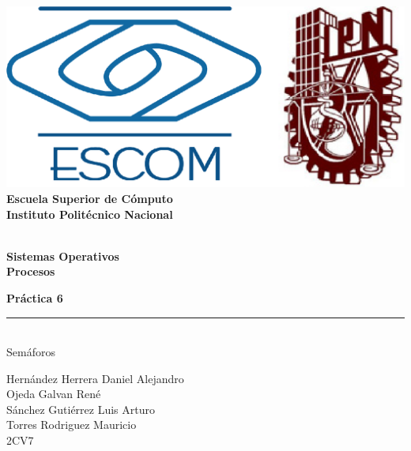 
\begin{titlepage} %

    \begin{flushright}

	   \includegraphics[scale=0.15]{imagenes/escom-ipn.png}
	   \large \textbf{\\Escuela Superior de C\'omputo}
	   \large \textbf{\\Instituto Polit\'ecnico Nacional }%

	   \vspace{2.5cm} %

	   \large \textbf{\\Sistemas Operativos}%
	   \large \textbf{\\Procesos}%

	   \vspace{1.2cm} %

	   \large \textbf{Pr\'actica 6}\\%
	   \rule{9cm}{3pt} %
	   \large{\\ Semáforos} %

	   \vspace{2.5cm} %

	   Hernández Herrera Daniel Alejandro \\ %
	   Ojeda Galvan René \\ 
	   Sánchez Gutiérrez Luis Arturo \\ 
	   Torres Rodriguez Mauricio \\ 
	   2CV7 %

	   \vspace{2.5cm} %

	   \date{\today}

    \end{flushright}

\end{titlepage}

